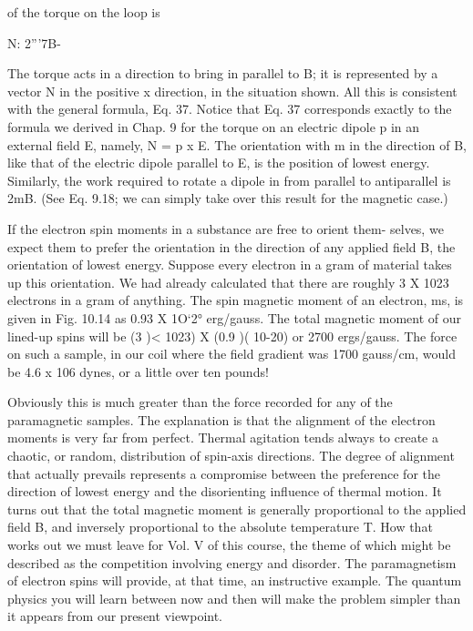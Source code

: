 of the torque on the loop is
\begin{equation}
\end{equation}

N: 2'''7B-%

The torque acts in a direction to bring in parallel to B; it is represented
by a vector N in the positive x direction, in the situation
shown. All this is consistent with the general formula, Eq. 37.
Notice that Eq. 37 corresponds exactly to the formula we derived
in Chap. 9 for the torque on an electric dipole p in an external field E,
namely, N = p x E. The orientation with m in the direction of B,
like that of the electric dipole parallel to E, is the position of lowest
energy. Similarly, the work required to rotate a dipole in from parallel
to antiparallel is 2mB. (See Eq. 9.18; we can simply take over
this result for the magnetic case.)

If the electron spin moments in a substance are free to orient them-
selves, we expect them to prefer the orientation in the direction of
any applied field B, the orientation of lowest energy. Suppose every
electron in a gram of material takes up this orientation. We had
already calculated that there are roughly 3 X 1023 electrons in a gram
of anything. The spin magnetic moment of an electron, ms, is given
in Fig. 10.14 as 0.93 X 1O‘2° erg/gauss. The total magnetic moment
of our lined-up spins will be (3 )< 1023) X (0.9 )( 10-20) or 2700
ergs/gauss. The force on such a sample, in our coil where the field
gradient was 1700 gauss/cm, would be 4.6 x 106 dynes, or a little
over ten pounds!

Obviously this is much greater than the force recorded for any of
the paramagnetic samples. The explanation is that the alignment
of the electron moments is very far from perfect. Thermal agitation
tends always to create a chaotic, or random, distribution of spin-axis
directions. The degree of alignment that actually prevails represents
a compromise between the preference for the direction of lowest
energy and the disorienting influence of thermal motion. It turns
out that the total magnetic moment is generally proportional to the
applied field B, and inversely proportional to the absolute temperature
T. How that works out we must leave for Vol. V of this course,
the theme of which might be described as the competition involving
energy and disorder. The paramagnetism of electron spins will
provide, at that time, an instructive example. The quantum physics
you will learn between now and then will make the problem simpler
than it appears from our present viewpoint.

